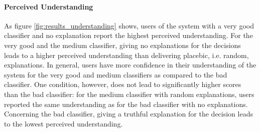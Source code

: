 \paragraph{Perceived Understanding}
As figure \ref{fig:results_understanding} shows, users of the system with a very good classifier and no explanation report the highest perceived understanding. For the very good and the medium classifier, giving no explanations for the decisions leads to a higher perceived understanding than delivering placebic, i.e. random, explanations. In general, users have more confidence in their understanding of the system for the very good and medium classifiers as compared to the bad classifier. One condition, however, does not lead to significantly higher scores than the bad classifier: for the medium classifier with random explanations, users reported the same understanding as for the bad classifier with no explanations. Concerning the bad classifier, giving a truthful explanation for the decision leads to the lowest perceived understanding.
